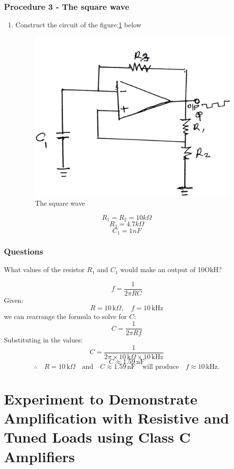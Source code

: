 \documentclass[12pt,a4paper]{article}
\begin{document}
    \subsubsection{Procedure 3 - The square wave}
    \begin{enumerate}
        \item Construct the circuit of the figure:\ref{fig:3} below
        \begin{figure}[H]
            \centering
            \includegraphics[width=0.5\linewidth]{circuit3_1.jpeg}
            \caption{The square wave}
            \label{fig:3}
        \end{figure}
    \end{enumerate}
    $$ R_1 = R_2 = 10k \Omega$$
    $$ R_3 = 4.7k \Omega$$
    $$ C_1 = 1nF $$
    \subsubsection{Questions}

    What values of the resistor $R_1$ and $C_1$ would make an output of 10OkH?

    \[
    f = \frac{1}{2 \pi RC}
    \]
    Given:
    \[
    R = 10 \, \text{k}\Omega, \quad f = 10 \, \text{kHz}
    \]
    we can rearrange the formula to solve for \( C \):
    \[
    C = \frac{1}{2 \pi R f}
    \]
    Substituting in the values:
    \[
    C = \frac{1}{2 \pi \times 10 \, \text{k}\Omega \times 10 \, \text{kHz}}
    \]
    \[
    C \approx 1.59 \, \text{nF}
    \]
    \[
    \therefore \quad R = 10 \, \text{k}\Omega \quad \text{and} \quad C \approx 1.59 \, \text{nF} \quad \text{will produce} \quad f \approx 10 \, \text{kHz}.
    \]



    \section{Experiment to Demonstrate Amplification with Resistive and Tuned Loads using Class C Amplifiers}
\end{document}
